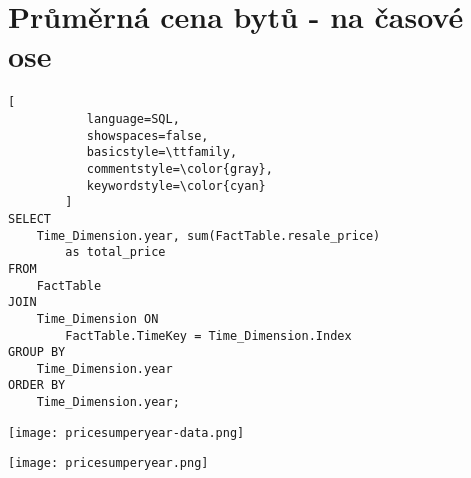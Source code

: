 \section{Průměrná cena bytů - na časové ose}

\begin{lstlisting}[
           language=SQL,
           showspaces=false,
           basicstyle=\ttfamily,
           commentstyle=\color{gray},
           keywordstyle=\color{cyan}
        ]
SELECT 
    Time_Dimension.year, sum(FactTable.resale_price) 
        as total_price 
FROM 
    FactTable 
JOIN 
    Time_Dimension ON 
        FactTable.TimeKey = Time_Dimension.Index 
GROUP BY 
    Time_Dimension.year 
ORDER BY 
    Time_Dimension.year;
\end{lstlisting}

\texttt{[image: pricesumperyear-data.png]}

\texttt{[image: pricesumperyear.png]}
